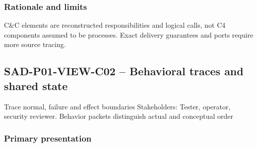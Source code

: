 \documentclass[10pt,letterpaper]{article}
\begin{document}
\subsubsection{Rationale and limits}
C\&C elements are reconstructed responsibilities and logical calls, not C4 components assumed to be processes. Exact delivery guarantees and ports require more source tracing.
\subsection{SAD-P01-VIEW-C02 -- Behavioral traces and shared state}
Trace normal, failure and effect boundaries Stakeholders: Tester, operator, security reviewer. Behavior packets distinguish actual and conceptual order
\subsubsection{Primary presentation}
\end{document}
